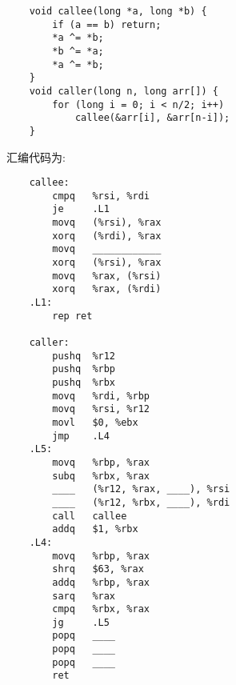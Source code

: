 \begin{problems}
\begin{verbatim}
    void callee(long *a, long *b) {
        if (a == b) return;
        *a ^= *b;
        *b ^= *a;
        *a ^= *b;
    }
    void caller(long n, long arr[]) {
        for (long i = 0; i < n/2; i++)
            callee(&arr[i], &arr[n-i]);
    }
        \end{verbatim}
        汇编代码为:
        \begin{verbatim}
    callee:
        cmpq   %rsi, %rdi
        je     .L1
        movq   (%rsi), %rax
        xorq   (%rdi), %rax
        movq   ____________
        xorq   (%rsi), %rax
        movq   %rax, (%rsi)
        xorq   %rax, (%rdi)
    .L1:
        rep ret

    caller:
        pushq  %r12
        pushq  %rbp
        pushq  %rbx
        movq   %rdi, %rbp
        movq   %rsi, %r12
        movl   $0, %ebx
        jmp    .L4
    .L5:
        movq   %rbp, %rax
        subq   %rbx, %rax
        ____   (%r12, %rax, ____), %rsi
        ____   (%r12, %rbx, ____), %rdi
        call   callee
        addq   $1, %rbx
    .L4:
        movq   %rbp, %rax
        shrq   $63, %rax
        addq   %rbp, %rax
        sarq   %rax
        cmpq   %rbx, %rax
        jg     .L5
        popq   ____
        popq   ____
        popq   ____
        ret
        \end{verbatim}
        

\end{problems}
